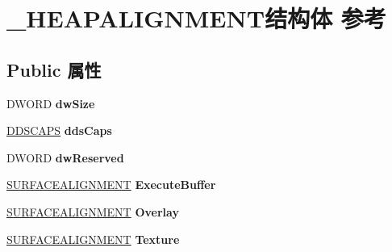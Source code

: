 \hypertarget{struct___h_e_a_p_a_l_i_g_n_m_e_n_t}{}\section{\+\_\+\+H\+E\+A\+P\+A\+L\+I\+G\+N\+M\+E\+N\+T结构体 参考}
\label{struct___h_e_a_p_a_l_i_g_n_m_e_n_t}
\subsection*{Public 属性}
\begin{DoxyCompactItemize}
\item 
\mbox{\label{struct___h_e_a_p_a_l_i_g_n_m_e_n_t_a33054f6153486af866b9ff52a4834e91}} 
D\+W\+O\+RD {\bfseries dw\+Size}
\item 
\mbox{\label{struct___h_e_a_p_a_l_i_g_n_m_e_n_t_a55221094a2c2944c21690d09b84ae7af}} 
\hyperlink{struct___d_d_s_c_a_p_s}{D\+D\+S\+C\+A\+PS} {\bfseries dds\+Caps}
\item 
\mbox{\label{struct___h_e_a_p_a_l_i_g_n_m_e_n_t_a4326280e61c9b453e8e9f56b5d24edaf}} 
D\+W\+O\+RD {\bfseries dw\+Reserved}
\item 
\mbox{\label{struct___h_e_a_p_a_l_i_g_n_m_e_n_t_aa7b59f8a660ff8e50fcf3420a4257736}} 
\hyperlink{struct___s_u_r_f_a_c_e_a_l_i_g_n_m_e_n_t}{S\+U\+R\+F\+A\+C\+E\+A\+L\+I\+G\+N\+M\+E\+NT} {\bfseries Execute\+Buffer}
\item 
\mbox{\label{struct___h_e_a_p_a_l_i_g_n_m_e_n_t_a272afd670aebe8f7ee12bb9fd530c3a6}} 
\hyperlink{struct___s_u_r_f_a_c_e_a_l_i_g_n_m_e_n_t}{S\+U\+R\+F\+A\+C\+E\+A\+L\+I\+G\+N\+M\+E\+NT} {\bfseries Overlay}
\item 
\mbox{\label{struct___h_e_a_p_a_l_i_g_n_m_e_n_t_a954e61b91ac08a1dfd9349ffc875d80f}} 
\hyperlink{struct___s_u_r_f_a_c_e_a_l_i_g_n_m_e_n_t}{S\+U\+R\+F\+A\+C\+E\+A\+L\+I\+G\+N\+M\+E\+NT} {\bfseries Texture}
\item 
\mbox{\label{struct___h_e_a_p_a_l_i_g_n_m_e_n_t_a52e0b6be2d7589acfff6ce2f1e283f59}} 

\end{DoxyCompactItemize}
